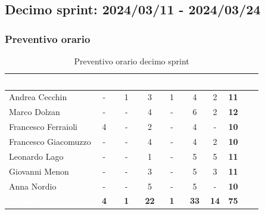 \subsection{Decimo sprint: 2024/03/11 - 2024/03/24}
\subsubsection{Preventivo orario}

{
\setlength{\tabcolsep}{10pt}
\renewcommand{\arraystretch}{1.5}
\begin{table}[h!]
    \centering
    \begin{tabularx}{\textwidth}{| l | c | c | c | c | c | c | X |}
        \hline
        \rowcolor{headerrow} \textbf{\textcolor{white}{Membro}} & \textbf{\textcolor{white}{R.}} & \textbf{\textcolor{white}{Am.}} & \textbf{\textcolor{white}{Pj.}} & \textbf{\textcolor{white}{An.}} & \textbf{\textcolor{white}{Pg.}} & \textbf{\textcolor{white}{V.}} & \textbf{\textcolor{white}{Totale}} \\
        \hline
        Andrea Cecchin & - & 1 & 3 & 1 & 4 & 2 & \textbf{11} \\
        \hline
        Marco Dolzan & - & - & 4 & - & 6 & 2 & \textbf{12} \\
        \hline
        Francesco Ferraioli & 4 & - & 2 & - & 4 & - & \textbf{10} \\
        \hline  
        Francesco Giacomuzzo & - & - & 4 & - & 4 & 2 & \textbf{10} \\
        \hline
        Leonardo Lago & - & - & 1 & - & 5 & 5 & \textbf{11} \\
        \hline
        Giovanni Menon & - & - & 3 & - & 5 & 3 & \textbf{11} \\
        \hline
        Anna Nordio & - & - & 5 & - & 5 & - & \textbf{10} \\
        \hline
    \cellcolor{headerrow} \textbf{\textcolor{white}{Totale}} & \textbf{4} & \textbf{1} & \textbf{22} & \textbf{1} & \textbf{33} & \textbf{14} & \textbf{75} \\
        \hline
    \end{tabularx} 
    \caption{Preventivo orario decimo sprint}
    \label{tab:preventivoorariodecimosprint}
\end{table}
}


